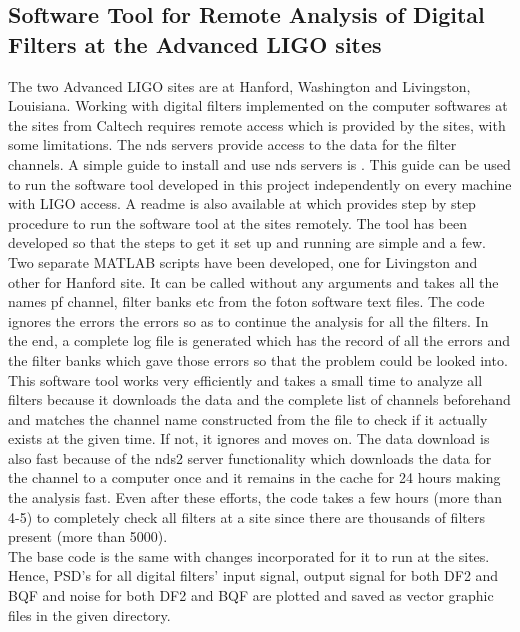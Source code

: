 \documentclass[colorlinks=true,pdfstartview=FitV,linkcolor=blue,
            citecolor=red,urlcolor=magenta]{ligodoc}
\begin{document}
	\subsection{Software Tool for Remote Analysis of Digital Filters at the Advanced LIGO sites}
	The two Advanced LIGO sites are at Hanford, Washington and Livingston, Louisiana. Working with digital filters implemented on the computer softwares at the sites from Caltech requires remote access which is provided by the sites, with some limitations. The nds servers provide access to the data for the filter channels. A simple guide to install and use nds servers is \cite{nds}. This guide can be used to run the software tool developed in this project independently on every machine with LIGO access. A readme is also available at \cite{git} which provides step by step procedure to run the software tool at the sites remotely. The tool has been developed so that the steps to get it set up and running are simple and a few. \\
	Two separate MATLAB scripts have been developed, one for Livingston and other for Hanford site. It can be called without any arguments and takes all the names pf channel, filter banks etc from the foton software text files. The code ignores the errors the errors so as to continue the analysis for all the filters. In the end, a complete log file is generated which has the record of all the errors and the filter banks which gave those errors so that the problem could be looked into. This software tool works very efficiently and takes a small time to analyze all filters because it downloads the data and the complete list of channels beforehand and matches the channel name constructed from the file to check if it actually exists at the given time. If not, it ignores and moves on. The data download is also fast because of the nds2 server functionality which downloads the data for the channel to a computer once and it remains in the cache for 24 hours making the analysis fast. Even after these efforts, the code takes a few hours (more than 4-5) to completely check all filters at a site since there are thousands of filters present (more than 5000). 
	\\The base code is the same with changes incorporated for it to run at the sites. Hence, PSD's for all digital filters' input signal, output signal for both DF2 and BQF and noise for both DF2 and BQF are plotted and saved as vector graphic files in the given directory. 
\end{document}
